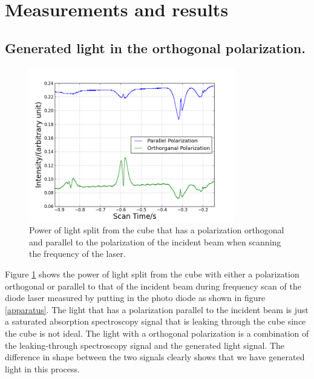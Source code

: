 \documentclass[aps,twocolumn,secnumarabic,balancelastpage,amsmath,amssymb,nofootinbib]{revtex4}
\begin{document}
\section{Measurements and results}
\subsection{Generated light in the orthogonal polarization.}
\begin{figure}
  \includegraphics[width=9cm]{../data/5-16_csv/intensities.png}
  \caption{Power of light split from the cube that has a polarization orthogonal and parallel to the polarization of the incident beam when scanning the frequency of the laser.}
  \label{intensities}
\end{figure}

Figure \ref{intensities} shows the power of light split from the cube with either a polarization orthogonal or parallel to that of the incident beam during frequency scan of the diode laser measured by putting in the photo diode as shown in figure \ref{apparatus}. The light that has a polarization parallel to the incident beam is just a saturated absorption spectroscopy signal that is leaking through the cube since the cube is not ideal. The light with a orthogonal polarization is a combination of the leaking-through spectroscopy signal and the generated light signal. The difference in shape between the two signals clearly shows that we have generated light in this process.
\end{document}
